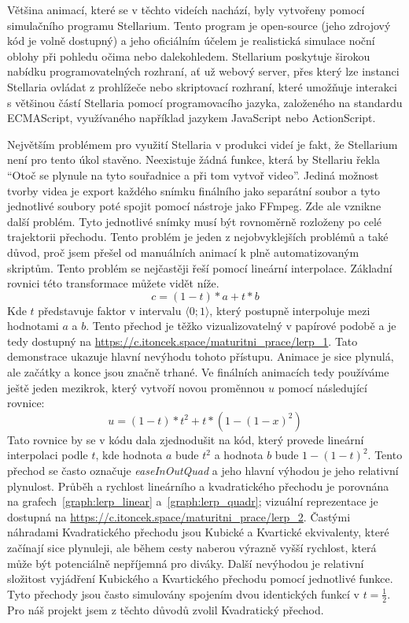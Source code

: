 \documentclass[12pt,a4paper,titlepage]{article}
\begin{document}
Většina animací, které se v těchto videích nachází, byly vytvořeny pomocí simulačního programu Stellarium. Tento program je open-source (jeho zdrojový kód je volně dostupný) a jeho oficiálním účelem je realistická simulace noční oblohy při pohledu očima nebo dalekohledem. Stellarium poskytuje širokou nabídku programovatelných rozhraní, ať už webový server, přes který lze instanci Stellaria ovládat z prohlížeče nebo skriptovací rozhraní, které umožňuje interakci s většinou částí Stellaria pomocí programovacího jazyka, založeného na standardu ECMAScript, využívaného například jazykem JavaScript nebo ActionScript.

Největším problémem pro využití Stellaria v produkci videí je fakt, že Stellarium není pro tento úkol stavěno. Neexistuje žádná funkce, která by Stellariu řekla \enquote{Otoč se plynule na tyto souřadnice a při tom vytvoř video}. Jediná možnost tvorby videa je export každého snímku finálního jako separátní soubor a tyto jednotlivé soubory poté spojit pomocí nástroje jako FFmpeg. Zde ale vznikne další problém. Tyto jednotlivé snímky musí být rovnoměrně rozloženy po celé trajektorii přechodu. Tento problém je jeden z nejobvyklejších problémů a také důvod, proč jsem přešel od manuálních animací k plně automatizovaným skriptům. Tento problém se nejčastěji řeší pomocí lineární interpolace. Základní rovnici této transformace můžete vidět níže.
\[c = (1-t)*a + t * b\] 
Kde $t$ představuje faktor v intervalu $\langle0;1\rangle$, který postupně interpoluje mezi hodnotami $a$ a $b$. Tento přechod je těžko vizualizovatelný v papírové podobě a je tedy dostupný na \url{https://c.itoncek.space/maturitni_prace/lerp_1}. Tato demonstrace ukazuje hlavní nevýhodu tohoto přístupu. Animace je sice plynulá, ale začátky a konce jsou značně trhané. Ve finálních animacích tedy používáme ještě jeden mezikrok, který vytvoří novou proměnnou $u$ pomocí následující rovnice:
\[u = (1 - t) * t^2 + t * (1-{(1-x)}^{2})\]
Tato rovnice by se v kódu dala zjednodušit na kód, který provede lineární interpolaci podle $t$, kde hodnota $a$ bude $t^{2}$ a hodnota $b$ bude $1-{(1-t)}^{2}$. Tento přechod se často označuje \textit{easeInOutQuad} a jeho hlavní výhodou je jeho relativní plynulost. Průběh a rychlost lineárního a kvadratického přechodu je porovnána na grafech~\ref{graph:lerp_linear} a~\ref{graph:lerp_quadr}; vizuální reprezentace je dostupná na \url{https://c.itoncek.space/maturitni_prace/lerp_2}. Častými náhradami Kvadratického přechodu jsou Kubické a Kvartické ekvivalenty, které začínají sice plynuleji, ale během cesty naberou výrazně vyšší rychlost, která může být potenciálně nepříjemná pro diváky. Další nevýhodou je relativní složitost vyjádření Kubického a Kvartického přechodu pomocí jednotlivé funkce. Tyto přechody jsou často simulovány spojením dvou identických funkcí v $t=\frac{1}{2}$. Pro náš projekt jsem z těchto důvodů zvolil Kvadratický přechod.
\end{document}
